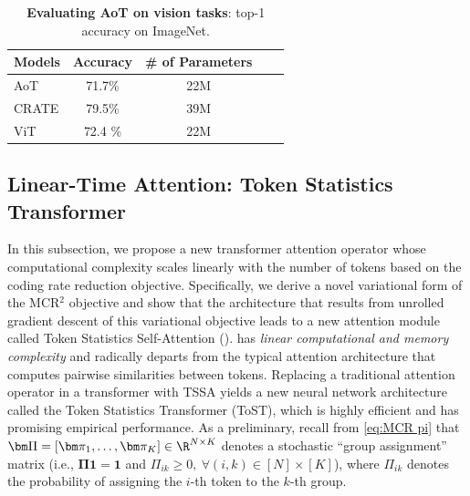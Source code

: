 \documentclass[../../book-main.tex]{subfiles}
\begin{document}
\begin{table}[!t]
    \caption{\textbf{Evaluating AoT on vision tasks}: top-1 accuracy
    on ImageNet.}
    \centering
    \begin{tabular}{lcccc}
        \toprule
        Models & Accuracy  & \# of Parameters \\
        \midrule
        \midrule
        AoT   & 71.7\% & 22M \\
        CRATE & 79.5\%  & 39M  \\
        ViT & 72.4 \% & 22M \\
        \bottomrule
    \end{tabular}
    \label{tab:aot_vision}
\end{table}

\subsection{Linear-Time Attention: Token Statistics Transformer}\label{sub:tost}

In this subsection, we propose a new transformer attention operator
whose computational complexity scales linearly with the number of
tokens based on the coding rate reduction objective.  Specifically,
we derive a novel variational form of the MCR$^2$ objective and show
that the architecture that results from unrolled gradient descent of
this variational objective leads to a new attention module called
Token Statistics Self-Attention ().  has
{\em linear computational and memory complexity} and radically
departs from the typical attention architecture that computes
pairwise similarities between tokens.  Replacing a traditional
attention operator in a transformer with TSSA yields a new neural
network architecture called the Token Statistics Transformer (ToST),
which is highly efficient and has promising empirical performance. As
a preliminary, recall from \eqref{eq:MCR pi} that $\bm \Pi = [\bm
\pi_1, \ldots, \bm \pi_K] \in \R^{N \times K}$ denotes a stochastic
``group assignment'' matrix (i.e., $\bm \Pi \bm 1 = \bm 1$ and
$\Pi_{ik} \geq 0, \  \forall (i,k) \in [N] \times [K]$), where
$\Pi_{ik}$ denotes the probability of assigning the $i$-th token to
the $k$-th group.
\end{document}
